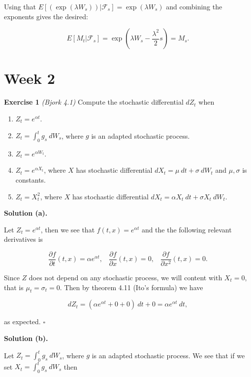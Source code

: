 \documentclass[
]{book}
\providecommand{\tightlist}{%
  \setlength{\itemsep}{0pt}\setlength{\parskip}{0pt}}
\begin{document}
Using that \(E\left.\left[\left(\exp\left(\lambda W_s\right)\right)\right\vert\mathcal{F}_s\right]=\exp\left(\lambda W_s\right)\) and combining the exponents gives the desired:

\[E[M_t\vert\mathcal{F}_s]=\exp\left(\lambda W_s-\frac{\lambda^2}{2}s\right)=M_s.\]

\hypertarget{week-2}{%
\section{Week 2}\label{week-2}}

\textbf{Exercise 1} \emph{(Bjork 4.1)} Compute the stochastic differential \(dZ_t\) when

\begin{enumerate}
\def\labelenumi{\alph{enumi}.}
\tightlist
\item
  \(Z_t=e^{\alpha t}\).
\item
  \(Z_t=\int_0^t g_s\ dW_s\), where \(g\) is an adapted stochastic process.
\item
  \(Z_t=e^{\alpha W_t}\).
\item
  \(Z_t=e^{\alpha X_t}\), where \(X\) has stochastic differential \(dX_t=\mu\ dt + \sigma\ dW_t\) and \(\mu,\sigma\) is constants.
\item
  \(Z_t=X_t^2\), where \(X\) has stochastic differential \(dX_t=\alpha X_t\ dt+\sigma X_t\ dW_t\).
\end{enumerate}

\textbf{Solution (a).}

Let \(Z_t=e^{\alpha t}\), then we see that \(f(t,x)=e^{\alpha t}\) and the the following relevant derivatives is

\[
\frac{\partial f}{\partial t}(t,x)=\alpha e^{\alpha t},\hspace{10pt}\frac{\partial f}{\partial x}(t,x) =0,\hspace{10pt}\frac{\partial f}{\partial x^2}(t,x) =0.
\]

Since \(Z\) does not depend on any stochastic process, we will content with \(X_t=0\), that is \(\mu_t=\sigma_t=0\). Then by theorem 4.11 (Ito's formula) we have

\[
dZ_t=\left(\alpha e^{\alpha t} +0+0\right)\ dt + 0=\alpha e^{\alpha t}\ dt,
\]

as expected. \(\square\)

\textbf{Solution (b).}

Let \(Z_t=\int_0^t g_s\ dW_s\), where \(g\) is an adapted stochastic process. We see that if we set \(X_t=\int_0^t g_s\ dW_s\) then
\end{document}
